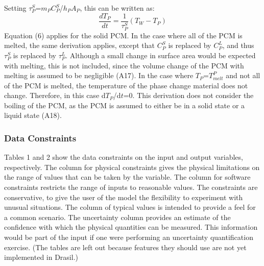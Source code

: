 \documentclass[12pt]{article}
\begin{document}
Setting $\tau{}_{P}^{S}$=$m_{P}$$C_{P}^{S}$/$h_{P}$$A_{P}$, this can be written as:
\begin{equation}
\frac{dT_{P}}{dt}=\frac{1}{\tau{}_{P}^{S}}(T_{W}-T_{P})
\end{equation}
Equation (6) applies for the solid PCM. In the case where all of the PCM is melted, the same derivation applies, except that $C_{P}^{S}$ is replaced by $C_{P}^{L}$, and thus $\tau{}_{P}^{S}$ is replaced by $\tau{}_{P}^{L}$. Although a small change in surface area would be expected with melting, this is not included, since the volume change of the PCM with melting is assumed to be negligible (A17).
In the case where $T_{P}$=$T_{melt}^{P}$ and not all of the PCM is melted, the temperature of the phase change material does not change. Therefore, in this case d$T_{P}$/d$t$=0.
This derivation does not consider the boiling of the PCM, as the PCM is assumed to either be in a solid state or a liquid state (A18).
\subsubsection{Data Constraints}
\label{Sec:DC}
Tables 1 and 2 show the data constraints on the input and output variables, respectively. The column for physical constraints gives the physical limitations on the range of values that can be taken by the variable. The column for software constraints restricts the range of inputs to reasonable values. The constraints are conservative, to give the user of the model the flexibility to experiment with unusual situations. The column of typical values is intended to provide a feel for a common scenario. The uncertainty column provides an estimate of the confidence with which the physical quantities can be measured. This information would be part of the input if one were performing an uncertainty quantification exercise. (The tables are left out because features they should use are not yet implemented in Drasil.)
\end{document}
